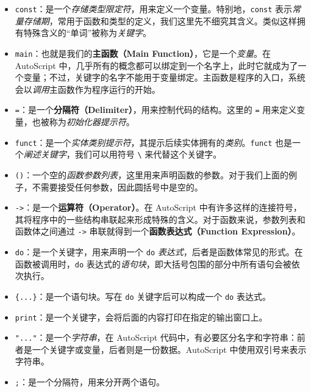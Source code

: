 \begin{itemize}
    \item \lstinline!const!：是一个\emph{存储类型限定符}，用来定义一个变量。特别地，\lstinline!const! 表示\emph{常量存储期}，常用于函数和类型的定义，我们这里先不细究其含义。类似这样拥有特殊含义的“单词”被称为\emph{关键字}。

    \item \lstinline!main!：也就是我们的\textbf{主函数（Main Function）}，它是一个\emph{变量}。在 AutoScript 中，几乎所有的概念都可以绑定到一个名字上，此时它就成为了一个变量；不过，关键字的名字不能用于变量绑定。主函数是程序的入口，系统会以\emph{调用}主函数作为程序运行的开始。

    \item \lstinline!=!：是一个\textbf{分隔符（Delimiter）}，用来控制代码的结构。这里的 \lstinline!=! 用来定义变量，也被称为\emph{初始化器提示符}。

    \item \lstinline!funct!：是一个\emph{实体类别提示符}，其提示后续实体拥有的\emph{类别}。\lstinline!funct! 也是一个\emph{阐述关键字}，我们可以用符号 \lstinline!\! 来代替这个关键字。

    \item \lstinline!()!：一个空的\emph{函数参数列表}，这里用来声明函数的参数。对于我们上面的例子，不需要接受任何参数，因此圆括号中是空的。

    \item \lstinline!->!：是一个\textbf{运算符（Operator）}。在 AutoScript 中有许多这样的连接符号，其将程序中的一些结构串联起来形成特殊的含义。对于函数来说，参数列表和函数体之间通过 \lstinline!->! 串联就得到一个\textbf{函数表达式（Function Expression）}。

    \item \lstinline!do!：是一个关键字，用来声明一个 \lstinline!do! \emph{表达式}，后者是函数体常见的形式。在函数被调用时，\lstinline!do! 表达式的\emph{语句块}，即大括号包围的部分中所有语句会被依次执行。

    \item \lstinline!{...}!：是一个语句块。写在 \lstinline!do! 关键字后可以构成一个 \lstinline!do! 表达式。

    \item \lstinline!print!：是一个关键字，会将后面的内容打印在指定的输出窗口上。

    \item \lstinline!"..."!：是一个\emph{字符串}，在 AutoScript 代码中，有必要区分名字和字符串：前者是一个关键字或变量，后者则是一份数据。AutoScript 中使用双引号来表示字符串。

    \item \lstinline!;!：是一个分隔符，用来分开两个语句。
\end{itemize}


